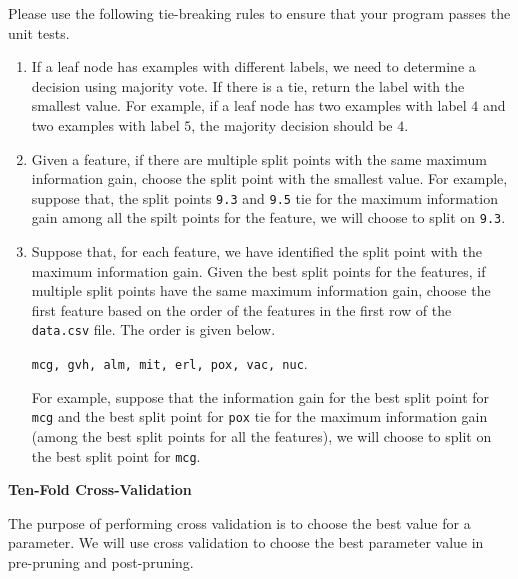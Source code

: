 \documentclass[12pt]{article}
\begin{document}
Please use the following tie-breaking rules to ensure that your program passes the unit tests.
\begin{enumerate}[(1)]
\item 
If a leaf node has examples with different labels, we need to determine a decision using majority vote. If there is a tie, return the label with the smallest value. For example, if a leaf node has two examples with label $4$ and two examples with label $5$, the majority decision should be $4$.

\item
Given a feature, if there are multiple split points with the same maximum information gain, choose the split point with the smallest value. For example, suppose that, the split points \verb+9.3+ and \verb+9.5+ tie for the maximum information gain among all the spilt points for the feature, we will choose to split on \verb+9.3+.

\item
Suppose that, for each feature, we have identified the split point with the maximum information gain. Given the best split points for the features, if multiple split points have the same maximum information gain, choose the first feature based on the order of the features in the first row of the \verb+data.csv+ file. The order is given below.

\verb+mcg, gvh, alm, mit, erl, pox, vac, nuc+.

For example, suppose that the information gain for the best split point for \verb+mcg+ and the best split point for \verb+pox+ tie for the maximum information gain (among the best split points for all the features), we will choose to split on the best split point for \verb+mcg+.

\end{enumerate}

{\bf Ten-Fold Cross-Validation}

The purpose of performing cross validation is to choose the best value for a parameter. We will use cross validation to choose the best parameter value in pre-pruning and post-pruning. 
\end{document}
